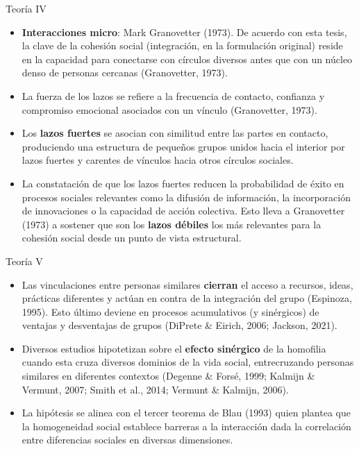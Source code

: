 \documentclass[
  8pt,
  ignorenonframetext,
]{beamer}
\begin{document}
\begin{frame}{Teoría IV}
\protect\hypertarget{teoruxeda-iv}{}
\begin{itemize}
\item
  \textbf{Interacciones micro}: Mark Granovetter (1973). De acuerdo con
  esta tesis, la clave de la cohesión social (integración, en la
  formulación original) reside en la capacidad para conectarse con
  círculos diversos antes que con un núcleo denso de personas cercanas
  (Granovetter, 1973).
\item
  La fuerza de los lazos se refiere a la frecuencia de contacto,
  confianza y compromiso emocional asociados con un vínculo
  (Granovetter, 1973).
\item
  Los \textbf{lazos fuertes} se asocian con similitud entre las partes
  en contacto, produciendo una estructura de pequeños grupos unidos
  hacia el interior por lazos fuertes y carentes de vínculos hacia otros
  círculos sociales.
\item
  La constatación de que los lazos fuertes reducen la probabilidad de
  éxito en procesos sociales relevantes como la difusión de información,
  la incorporación de innovaciones o la capacidad de acción colectiva.
  Esto lleva a Granovetter (1973) a sostener que son los \textbf{lazos
  débiles} los más relevantes para la cohesión social desde un punto de
  vista estructural.
\end{itemize}
\end{frame}

\begin{frame}{Teoría V}
\protect\hypertarget{teoruxeda-v}{}
\begin{itemize}
\item
  Las vinculaciones entre personas similares \textbf{cierran} el acceso
  a recursos, ideas, prácticas diferentes y actúan en contra de la
  integración del grupo (Espinoza, 1995). Esto último deviene en
  procesos acumulativos (y sinérgicos) de ventajas y desventajas de
  grupos (DiPrete \& Eirich, 2006; Jackson, 2021).
\item
  Diversos estudios hipotetizan sobre el \textbf{efecto sinérgico} de la
  homofilia cuando esta cruza diversos dominios de la vida social,
  entrecruzando personas similares en diferentes contextos (Degenne \&
  Forsé, 1999; Kalmijn \& Vermunt, 2007; Smith et al., 2014; Vermunt \&
  Kalmijn, 2006).
\item
  La hipótesis se alinea con el tercer teorema de Blau (1993) quien
  plantea que la homogeneidad social establece barreras a la interacción
  dada la correlación entre diferencias sociales en diversas
  dimensiones.
\end{itemize}
\end{frame}
\end{document}
